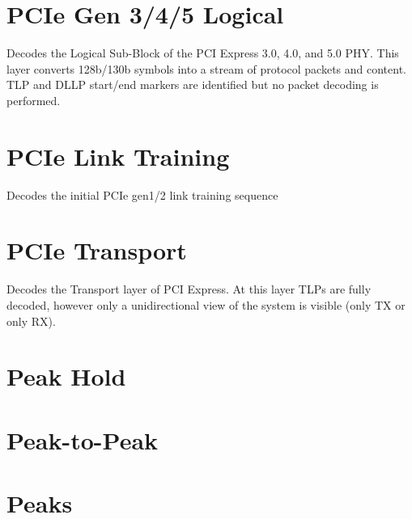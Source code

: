 \pagebreak
\section{PCIe Gen 3/4/5 Logical}

Decodes the Logical Sub-Block of the PCI Express 3.0, 4.0, and 5.0 PHY. This layer converts 128b/130b symbols into a
stream of protocol packets and content. TLP and DLLP start/end markers are identified but no packet decoding is
performed.

\pagebreak
\section{PCIe Link Training}

Decodes the initial PCIe gen1/2 link training sequence

\pagebreak
\section{PCIe Transport}

Decodes the Transport layer of PCI Express. At this layer TLPs are fully decoded, however only a unidirectional view
of the system is visible (only TX or only RX).

\pagebreak
\section{Peak Hold}

\pagebreak
\section{Peak-to-Peak}

\pagebreak
\section{Peaks}

